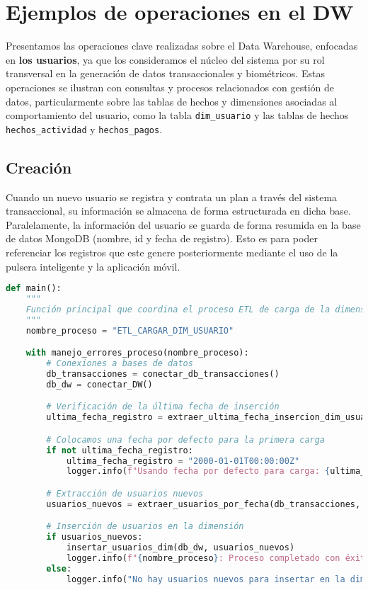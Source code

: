 

\section{Ejemplos de operaciones en el DW}

Presentamos las operaciones clave realizadas sobre el Data Warehouse, enfocadas en {\bfseries los usuarios}, ya que los consideramos el núcleo del sistema por su rol transversal en la generación de datos transaccionales y biométricos. Estas operaciones se ilustran con consultas y procesos relacionados con gestión de datos, particularmente sobre las tablas de hechos y dimensiones asociadas al comportamiento del usuario, como la tabla \texttt{dim\_usuario} y las tablas de hechos \texttt{hechos\_actividad} y \texttt{hechos\_pagos}.
\subsection{Creación}
Cuando un nuevo usuario se registra y contrata un plan a través del sistema transaccional, su información se almacena de forma estructurada en dicha base. Paralelamente, la información del usuario se guarda de forma resumida en la base de datos MongoDB (nombre, id y fecha de registro). Esto es para poder referenciar los registros que este genere posteriormente mediante el uso de la pulsera inteligente y la aplicación móvil.

\begin{lstlisting}[language=Python]
    def main():
    """
    Función principal que coordina el proceso ETL de carga de la dimensión de usuarios.
    """
    nombre_proceso = "ETL_CARGAR_DIM_USUARIO"

    with manejo_errores_proceso(nombre_proceso):
        # Conexiones a bases de datos
        db_transacciones = conectar_db_transacciones()
        db_dw = conectar_DW()

        # Verificación de la última fecha de inserción
        ultima_fecha_registro = extraer_ultima_fecha_insercion_dim_usuarios(db_dw)

        # Colocamos una fecha por defecto para la primera carga
        if not ultima_fecha_registro:
            ultima_fecha_registro = "2000-01-01T00:00:00Z"
            logger.info(f"Usando fecha por defecto para carga: {ultima_fecha_registro}")

        # Extracción de usuarios nuevos
        usuarios_nuevos = extraer_usuarios_por_fecha(db_transacciones, ultima_fecha_registro)

        # Inserción de usuarios en la dimensión
        if usuarios_nuevos:
            insertar_usuarios_dim(db_dw, usuarios_nuevos)
            logger.info(f"{nombre_proceso}: Proceso completado con éxito.")
        else:
            logger.info("No hay usuarios nuevos para insertar en la dimensión.")

\end{lstlisting}

